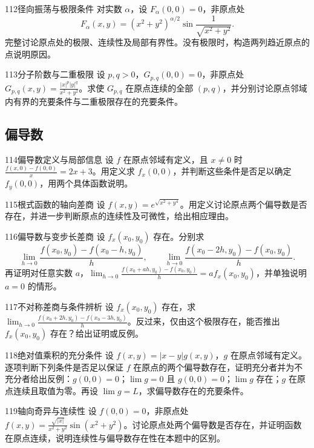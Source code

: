 \begin{exercise}{112}{径向振荡与极限条件}
对实数 $\alpha$，设 $F_\alpha(0,0)=0$，非原点处
\[
F_\alpha(x,y)=(x^2+y^2)^{\alpha/2}\sin\frac1{\sqrt{x^2+y^2}}.
\]
完整讨论原点处的极限、连续性及局部有界性。没有极限时，构造两列趋近原点的点说明原因。
\end{exercise}
\begin{exercise}{113}{分子阶数与二重极限}
设 $p,q>0$，$G_{p,q}(0,0)=0$，非原点处 $G_{p,q}(x,y)=\frac{|x|^p|y|^q}{x^2+y^2}$。求使 $G_{p,q}$ 在原点连续的全部 $(p,q)$，并分别讨论原点邻域内有界的充要条件与二重极限存在的充要条件。
\end{exercise}
\subsection{偏导数}
\begin{exercise}{114}{偏导数定义与局部信息}
设 $f$ 在原点邻域有定义，且 $x\ne0$ 时 $\frac{f(x,0)-f(0,0)}x=2x+3$。用定义求 $f_x(0,0)$，并判断这些条件是否足以确定 $f_y(0,0)$，用两个具体函数说明。
\end{exercise}
\begin{exercise}{115}{根式函数的轴向差商}
设 $f(x,y)=e^{\sqrt{x^2+y^4}}$。用定义讨论原点两个偏导数是否存在，并进一步判断原点的连续性及可微性，给出相应理由。
\end{exercise}
\begin{exercise}{116}{偏导数与变步长差商}
设 $f_x(x_0,y_0)$ 存在。分别求
\[
\lim_{h\to0}\frac{f(x_0,y_0)-f(x_0-h,y_0)}h,\qquad
\lim_{h\to0}\frac{f(x_0-2h,y_0)-f(x_0,y_0)}h.
\]
再证明对任意实数 $a$，$\lim_{h\to0}\frac{f(x_0+ah,y_0)-f(x_0,y_0)}h=a f_x(x_0,y_0)$，并单独说明 $a=0$ 的情形。
\end{exercise}
\begin{exercise}{117}{不对称差商与条件辨析}
设 $f_x(x_0,y_0)$ 存在，求 $\lim_{h\to0}\frac{f(x_0+2h,y_0)-f(x_0-3h,y_0)}h$。反过来，仅由这个极限存在，能否推出 $f_x(x_0,y_0)$ 存在？给出证明或反例。
\end{exercise}
\begin{exercise}{118}{绝对值乘积的充分条件}
设 $f(x,y)=|x-y|g(x,y)$，$g$ 在原点邻域有定义。逐项判断下列条件是否足以保证 $f$ 在原点的两个偏导数存在，证明充分者并为不充分者给出反例：$g(0,0)=0$；$\lim g=0$ 且 $g(0,0)=0$；$\lim g$ 存在；$g$ 在原点连续且取值为零。再设 $\lim g=L$，求偏导数存在的充要条件。
\end{exercise}
\begin{exercise}{119}{轴向奇异与连续性}
设 $f(0,0)=0$，非原点处 $f(x,y)=\frac{\sqrt{|x|}}{x^2+y^2}\sin(x^2+y^2)$。讨论原点处两个偏导数是否存在，并证明函数在原点连续，说明连续性与偏导数存在性在本题中的区别。
\end{exercise}
